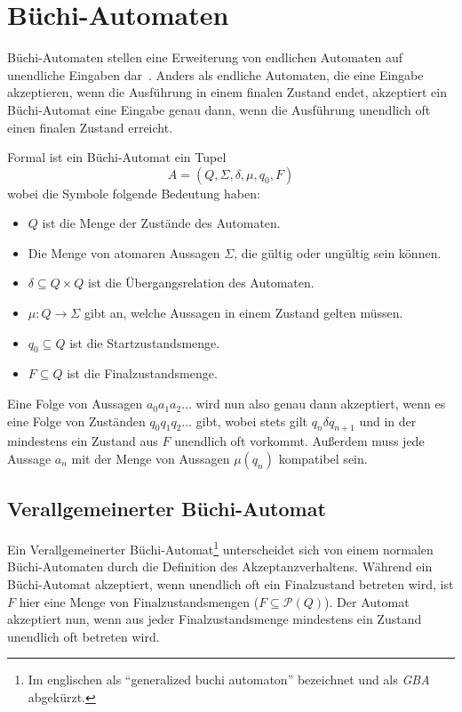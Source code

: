 \section{Büchi-Automaten}
Büchi-Automaten stellen eine Erweiterung von endlichen Automaten auf unendliche Eingaben dar~\cite{buchibasics}.
Anders als endliche Automaten, die eine Eingabe akzeptieren, wenn die Ausführung in einem finalen Zustand endet, akzeptiert ein Büchi-Automat eine Eingabe genau dann, wenn die Ausführung unendlich oft einen finalen Zustand erreicht.

Formal ist ein Büchi-Automat ein Tupel
\[ A = (Q,\Sigma,\delta,\mu,q_0,F) \]
wobei die Symbole folgende Bedeutung haben:
\begin{itemize}
  \item $Q$ ist die Menge der Zustände des Automaten.
  \item Die Menge von atomaren Aussagen $\Sigma$, die gültig oder ungültig sein können.
  \item $\delta\subseteq Q\times Q$ ist die Übergangsrelation des Automaten.
  \item $\mu : Q\rightarrow\Sigma$ gibt an, welche Aussagen in einem Zustand gelten müssen.
  \item $q_0\subseteq Q$ ist die Startzustandsmenge.
  \item $F\subseteq Q$ ist die Finalzustandsmenge.
\end{itemize}
Eine Folge von Aussagen $a_0a_1a_2\dots$ wird nun also genau dann akzeptiert, wenn es eine Folge von Zuständen $q_0q_1q_2\dots$ gibt, wobei stets gilt $q_n\delta q_{n+1}$ und in der mindestens ein Zustand aus $F$ unendlich oft vorkommt.
Außerdem muss jede Aussage $a_n$ mit der Menge von Aussagen $\mu(q_n)$ kompatibel sein.

\subsection{Verallgemeinerter Büchi-Automat}
\label{sec:gba}
Ein Verallgemeinerter Büchi-Automat\footnote{Im englischen als "`generalized buchi automaton"' bezeichnet und als \emph{GBA} abgekürzt.} unterscheidet sich von einem normalen Büchi-Automaten durch die Definition des Akzeptanzverhaltens.
Während ein Büchi-Automat akzeptiert, wenn unendlich oft ein Finalzustand betreten wird, ist $F$ hier eine Menge von Finalzustandsmengen ($F\subseteq\mathcal{P}(Q)$).
Der Automat akzeptiert nun, wenn aus jeder Finalzustandsmenge mindestens ein Zustand unendlich oft betreten wird.

